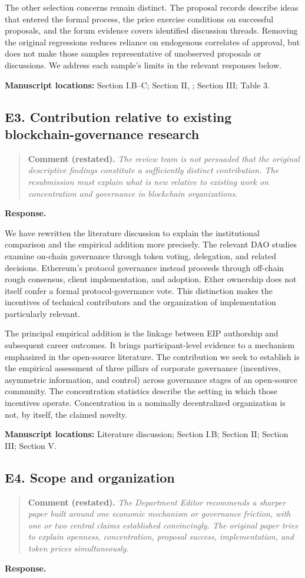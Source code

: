 \documentclass[11pt,letterpaper]{article}
\newcommand{\point}[3]{%
  \Needspace{7\baselineskip}
  \subsection*{#1. #2}\phantomsection\label{pt:#1}%
  \begin{quote}\small\textbf{Comment (restated).} \textit{#3}\end{quote}%
  \textbf{Response.}\enspace\ignorespaces}
\newcommand{\locations}[1]{\par{\small\textbf{Manuscript locations:} #1.}\par}
\begin{document}
The other selection concerns remain distinct. The proposal records describe ideas that entered the formal process, the price exercise conditions on successful proposals, and the forum evidence covers identified discussion threads. Removing the original regressions reduces reliance on endogenous correlates of approval, but does not make those samples representative of unobserved proposals or discussions. We address each sample's limits in the relevant responses below.

\locations{Section I.B--C; Section II, ; Section III; Table 3}

\point{E3}{Contribution relative to existing blockchain-governance research}{The review team is not persuaded that the original descriptive findings constitute a sufficiently distinct contribution. The resubmission must explain what is new relative to existing work on concentration and governance in blockchain organizations.}

We have rewritten the literature discussion to explain the institutional comparison and the empirical addition more precisely. The relevant DAO studies examine on-chain governance through token voting, delegation, and related decisions. Ethereum's protocol governance instead proceeds through off-chain rough consensus, client implementation, and adoption. Ether ownership does not itself confer a formal protocol-governance vote. This distinction makes the incentives of technical contributors and the organization of implementation particularly relevant.

The principal empirical addition is the linkage between EIP authorship and subsequent career outcomes. It brings participant-level evidence to a mechanism emphasized in the open-source literature. The contribution we seek to establish is the empirical assessment of three pillars of corporate governance (incentives, asymmetric information, and control) across governance stages of an open-source community. The concentration statistics describe the setting in which those incentives operate. Concentration in a nominally decentralized organization is not, by itself, the claimed novelty.

\locations{Literature discussion; Section I.B; Section II; Section III; Section V}

\point{E4}{Scope and organization}{The Department Editor recommends a sharper paper built around one economic mechanism or governance friction, with one or two central claims established convincingly. The original paper tries to explain openness, concentration, proposal success, implementation, and token prices simultaneously.}
\end{document}
